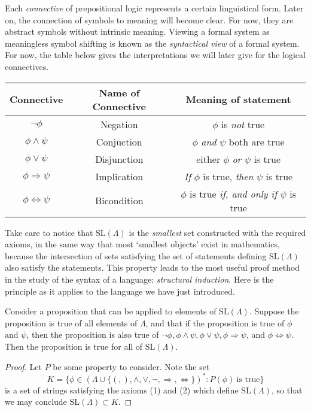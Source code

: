 Each \emph{connective} of prepositional logic represents a certain linguistical form. Later on, the connection of symbols to meaning will become clear. For now, they are abstract symbols without intrinsic meaning. Viewing a formal system as meaningless symbol shifting is known as the {\it syntactical view} of a formal system. For now, the table below gives the interpretations we will later give for the logical connectives.
%
\begin{center}
\begin{tabular}{| c | c | c |}
    \hline Connective & Name of Connective & Meaning of statement \\
    \hline $\neg \phi$ & Negation & $\phi$ is {\it not} true\\
    $\phi \wedge \psi$ & Conjuction & $\phi$ {\it and} $\psi$ both are true\\
    $\phi \vee \psi$ & Disjunction & either $\phi$ {\it or} $\psi$ is true\\
    $\phi \Rightarrow \psi$ & Implication & {\it If} $\phi$ is true, {\it then} $\psi$ is true\\
    $\phi \Leftrightarrow \psi$ & Bicondition & $\phi$ is true {\it if, and only if} $\psi$ is true\\
    \hline
\end{tabular}
\end{center}

Take care to notice that $\text{SL}(\Lambda)$ is the {\it smallest} set constructed with the required axioms, in the same way that most `smallest objects' exist in mathematics, because the intersection of sets satisfying the set of statements defining $\text{SL}(\Lambda)$ also satisfy the statements. This property leads to the most useful proof method in the study of the syntax of a language: \emph{structural induction}. Here is the principle as it applies to the language we have just introduced.

\begin{theorem}
    Consider a proposition that can be applied to elements of $\text{SL}(\Lambda)$. Suppose the proposition is true of all elements of $\Lambda$, and that if the proposition is true of $\phi$ and $\psi$, then the proposition is also true of $\neg \phi, \phi \wedge \psi, \phi \vee \psi, \phi \Rightarrow \psi$, and $\phi \Leftrightarrow \psi$. Then the proposition is true for all of $\text{SL}(\Lambda)$.
\end{theorem}
\begin{proof}
    Let $P$ be some property to consider. Note the set
    \[ K = \{ \phi \in (\Lambda \cup \{ (, ), \wedge, \vee, \neg, \Rightarrow, \Leftrightarrow \})^* : P(\phi)\ \text{is true} \} \]
    is a set of strings satisfying the axioms (1) and (2) which define $\text{SL}(\Lambda)$, so that we may conclude $\text{SL}(\Lambda) \subset K$.
\end{proof}

